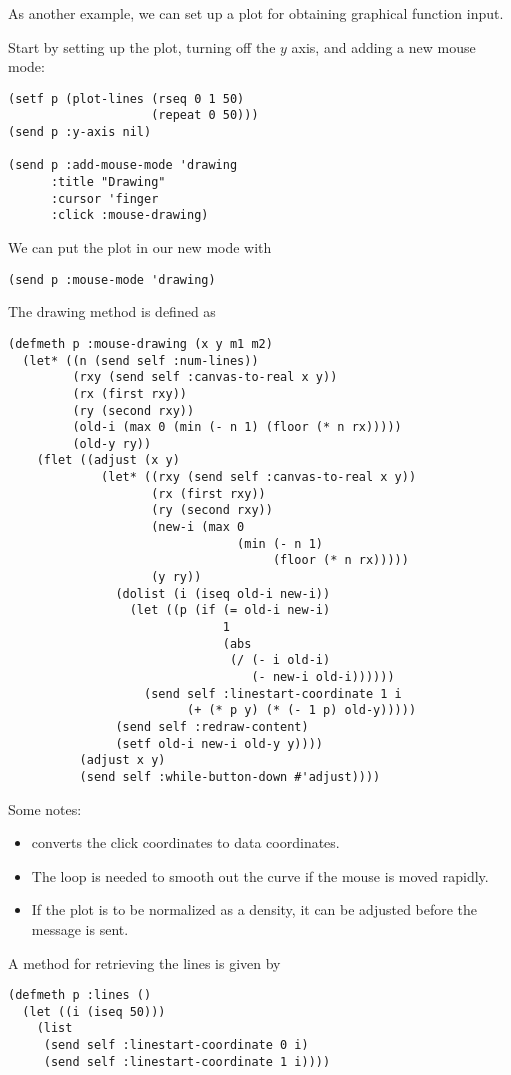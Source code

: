 \begin{slide}{}
As another example, we can set up a plot for obtaining graphical function
input.

Start by setting up the plot, turning off the $y$ axis, and adding
a new mouse mode:
{\Large
\begin{verbatim}
(setf p (plot-lines (rseq 0 1 50)
                    (repeat 0 50)))
(send p :y-axis nil)

(send p :add-mouse-mode 'drawing
      :title "Drawing"
      :cursor 'finger
      :click :mouse-drawing)
\end{verbatim}}
We can put the plot in our new mode with
{\Large
\begin{verbatim}
(send p :mouse-mode 'drawing)
\end{verbatim}}
\end{slide}

\begin{slide}{}
The drawing method is defined as
{\large
\begin{verbatim}
(defmeth p :mouse-drawing (x y m1 m2)
  (let* ((n (send self :num-lines))
         (rxy (send self :canvas-to-real x y))
         (rx (first rxy))
         (ry (second rxy))
         (old-i (max 0 (min (- n 1) (floor (* n rx)))))
         (old-y ry))
    (flet ((adjust (x y) 
             (let* ((rxy (send self :canvas-to-real x y))
                    (rx (first rxy))
                    (ry (second rxy))
                    (new-i (max 0
                                (min (- n 1) 
                                     (floor (* n rx)))))
                    (y ry))
               (dolist (i (iseq old-i new-i))
                 (let ((p (if (= old-i new-i) 
                              1
                              (abs
                               (/ (- i old-i) 
                                  (- new-i old-i))))))
                   (send self :linestart-coordinate 1 i 
                         (+ (* p y) (* (- 1 p) old-y)))))       
               (send self :redraw-content)
               (setf old-i new-i old-y y))))
          (adjust x y)
          (send self :while-button-down #'adjust))))
\end{verbatim}}
\end{slide}

\begin{slide}{}
Some notes:
\begin{itemize}
\item
{} converts the click coordinates to data
coordinates.
\item
The  loop is needed to smooth out the curve if the mouse
is moved rapidly.
\item
If the plot is to be normalized as a density, it can be adjusted before
the  message is sent.
\end{itemize}
A method for retrieving the lines is given by
{\Large
\begin{verbatim}
(defmeth p :lines ()
  (let ((i (iseq 50)))
    (list
     (send self :linestart-coordinate 0 i)
     (send self :linestart-coordinate 1 i))))
\end{verbatim}}
\end{slide}


